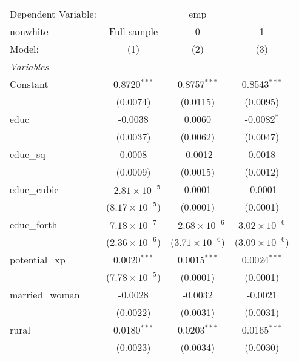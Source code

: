 
\begingroup
\centering
\begin{tabular}{lccc}
   \tabularnewline \midrule \midrule
   Dependent Variable: & \multicolumn{3}{c}{emp}\\
   nonwhite        & Full sample             & 0                       & 1 \\   
   Model:          & (1)                     & (2)                     & (3)\\  
   \midrule
   \emph{Variables}\\
   Constant        & 0.8720$^{***}$          & 0.8757$^{***}$          & 0.8543$^{***}$\\   
                   & (0.0074)                & (0.0115)                & (0.0095)\\   
   educ            & -0.0038                 & 0.0060                  & -0.0082$^{*}$\\   
                   & (0.0037)                & (0.0062)                & (0.0047)\\   
   educ\_sq        & 0.0008                  & -0.0012                 & 0.0018\\   
                   & (0.0009)                & (0.0015)                & (0.0012)\\   
   educ\_cubic     & $-2.81\times 10^{-5}$   & 0.0001                  & -0.0001\\   
                   & ($8.17\times 10^{-5}$)  & (0.0001)                & (0.0001)\\   
   educ\_forth     & $7.18\times 10^{-7}$    & $-2.68\times 10^{-6}$   & $3.02\times 10^{-6}$\\    
                   & ($2.36\times 10^{-6}$)  & ($3.71\times 10^{-6}$)  & ($3.09\times 10^{-6}$)\\    
   potential\_xp   & 0.0020$^{***}$          & 0.0015$^{***}$          & 0.0024$^{***}$\\   
                   & ($7.78\times 10^{-5}$)  & (0.0001)                & (0.0001)\\   
   married\_woman  & -0.0028                 & -0.0032                 & -0.0021\\   
                   & (0.0022)                & (0.0031)                & (0.0031)\\   
   rural           & 0.0180$^{***}$          & 0.0203$^{***}$          & 0.0165$^{***}$\\   
                   & (0.0023)                & (0.0034)                & (0.0030)\\   

\end{tabular}
